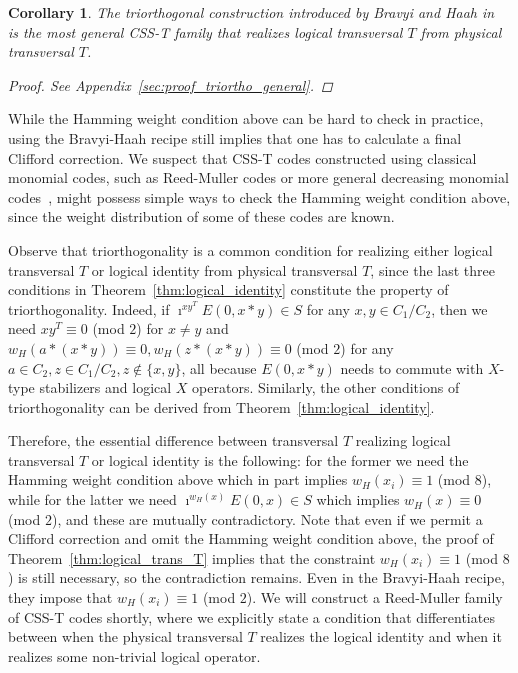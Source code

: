 \documentclass[twoside,romanappendices]{IEEEtran}
\newtheorem{corollary}[theorem]{Corollary}
\begin{document}
\begin{corollary}
\label{cor:triortho_general}
The triorthogonal construction introduced by Bravyi and Haah in~\cite{Bravyi-pra12} is the most general CSS-T family that realizes logical transversal $T$ from physical transversal $T$.
\begin{proof}
See Appendix~\ref{sec:proof_triortho_general}.
\end{proof}
\end{corollary}


While the Hamming weight condition above can be hard to check in practice, using the Bravyi-Haah recipe still implies that one has to calculate a final Clifford correction.
We suspect that CSS-T codes constructed using classical monomial codes, such as Reed-Muller codes or more general decreasing monomial codes~\cite{Bardet-isit16,Krishna-arxiv18}, might possess simple ways to check the Hamming weight condition above, since the weight distribution of some of these codes are known.


Observe that triorthogonality is a common condition for realizing either logical transversal $T$ or logical identity from physical transversal $T$, since the last three conditions in Theorem~\ref{thm:logical_identity} constitute the property of triorthogonality.
Indeed, if $\imath^{xy^T} E(0,x \ast y) \in S$ for any $x,y \in C_1/C_2$, then we need $xy^T \equiv 0$ (mod $2$) for $x \neq y$ and $w_H(a \ast (x \ast y)) \equiv 0, w_H(z \ast (x \ast y)) \equiv 0$ (mod $2$) for any $a \in C_2, z \in C_1/C_2, z \notin \{ x,y \}$, all because $E(0,x \ast y)$ needs to commute with $X$-type stabilizers and logical $X$ operators.
Similarly, the other conditions of triorthogonality can be derived from Theorem~\ref{thm:logical_identity}.

Therefore, the essential difference between transversal $T$ realizing logical transversal $T$ or logical identity is the following: for the former we need the Hamming weight condition above which in part implies $w_H(x_i) \equiv 1$ (mod $8$), while for the latter we need $\imath^{w_H(x)} E(0,x) \in S$ which implies $w_H(x) \equiv 0$ (mod $2$), and these are mutually contradictory.
Note that even if we permit a Clifford correction and omit the Hamming weight condition above, the proof of Theorem~\ref{thm:logical_trans_T} implies that the constraint $w_H(x_i) \equiv 1$ (mod $8$) is still necessary, so the contradiction remains.
Even in the Bravyi-Haah recipe, they impose that $w_H(x_i) \equiv 1$ (mod $2$).
We will construct a Reed-Muller family of CSS-T codes shortly, where we explicitly state a condition that differentiates between when the physical transversal $T$ realizes the logical identity and when it realizes some non-trivial logical operator.
\end{document}
